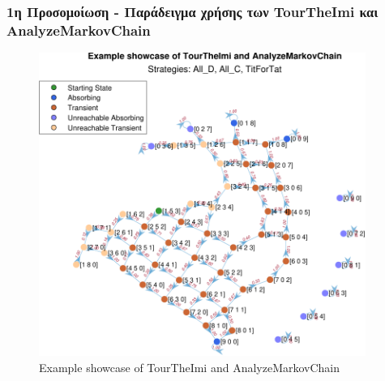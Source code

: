 \documentclass[12pt]{article}
\begin{document}
\subsubsection{1η Προσομοίωση - Παράδειγμα χρήσης των TourTheImi και Analyze\-Markov\-Chain}
	\begin{figure}[H]
	      \centering
	      \includegraphics[width=0.95\textwidth]{Example showcase of TourTheImi and AnalyzeMarkovChain.pdf}
	      \caption{Example showcase of TourTheImi and AnalyzeMarkovChain}
	\end{figure}
\end{document}
